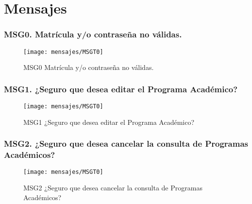 \chapter{Mensajes}

\subsection{MSG0. Matrícula y/o contraseña no válidas.}
    \begin{figure}[htbp]
        \begin{center}
            \texttt{[image: mensajes/MSGT0]}
            \caption{MSG0 Matrícula y/o contraseña no válidas.}
            \label{fig:MSG0}
        \end{center}
    \end{figure}
    
\subsection{MSG1. ¿Seguro que desea editar el Programa Académico?}
    \begin{figure}[htbp]
        \begin{center}
            \texttt{[image: mensajes/MSGT0]}
            \caption{MSG1 ¿Seguro que desea editar el Programa Académico?}
            \label{fig:MSG1}
        \end{center}
    \end{figure}
    
\subsection{MSG2. ¿Seguro que desea cancelar la consulta de Programas Académicos?}
    \begin{figure}[htbp]
        \begin{center}
            \texttt{[image: mensajes/MSGT0]}
            \caption{MSG2 ¿Seguro que desea cancelar la consulta de Programas Académicos?}
            \label{fig:MSG2}
        \end{center}
    \end{figure}
    
